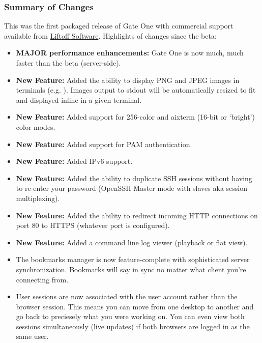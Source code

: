 \documentclass[letterpaper,10pt,openany]{sphinxmanual}
\begin{document}
\subsubsection{Summary of Changes}
\label{ReleaseNotes/index:id4}
This was the first packaged release of Gate One with commercial support available from \href{http://liftoffsoftware.com/}{Liftoff Software}.  Highlights of changes since the beta:
\begin{itemize}
\item {} 
\textbf{MAJOR performance enhancements:}  Gate One is now much, much faster than the beta (server-side).

\item {} 
\textbf{New Feature:} Added the ability to display PNG and JPEG images in terminals (e.g. ).  Images output to stdout will be automatically resized to fit and displayed inline in a given terminal.

\item {} 
\textbf{New Feature:} Added support for 256-color and aixterm (16-bit or `bright') color modes.

\item {} 
\textbf{New Feature:} Added support for PAM authentication.

\item {} 
\textbf{New Feature:} Added IPv6 support.

\item {} 
\textbf{New Feature:} Added the ability to duplicate SSH sessions without having to re-enter your password (OpenSSH Master mode with slaves aka session multiplexing).

\item {} 
\textbf{New Feature:} Added the ability to redirect incoming HTTP connections on port 80 to HTTPS (whatever port is configured).

\item {} 
\textbf{New Feature:} Added a command line log viewer (playback or flat view).

\item {} 
The bookmarks manager is now feature-complete with sophisticated server synchronization.  Bookmarks will say in sync no matter what client you're connecting from.

\item {} 
User sessions are now associated with the user account rather than the browser session.  This means you can move from one desktop to another and go back to preciesely what you were working on.  You can even view both sessions simultaneously (live updates) if both browsers are logged in as the same user.


\end{itemize}
\end{document}
